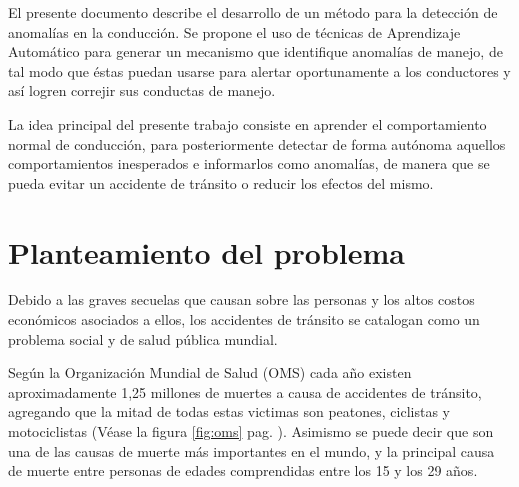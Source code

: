 
El presente documento describe el desarrollo de un m\'{e}todo para la detecci\'{o}n de anomal\'{i}as en la conducci\'{o}n. Se propone el uso de t\'{e}cnicas de Aprendizaje Autom\'{a}tico para generar un mecanismo que identifique anomal\'{i}as de manejo, de tal modo que \'{e}stas puedan usarse para alertar oportunamente a los conductores y as\'{i} logren correjir sus conductas de manejo.

\vspace{5mm} %

La idea principal del presente trabajo consiste en aprender el comportamiento normal de conducci\'{o}n, para posteriormente detectar de forma aut\'{o}noma aquellos comportamientos inesperados e informarlos como anomal\'{i}as, de manera que se pueda evitar  un accidente de tr\'{a}nsito o reducir los efectos del mismo.


\section{Planteamiento del problema}

Debido a las graves secuelas que causan sobre las personas y los altos costos econ\'{o}micos asociados a ellos, los accidentes de tr\'{a}nsito se catalogan como un problema social y de salud p\'{u}blica mundial.

\vspace{5mm} %

Seg\'{u}n la Organizaci\'{o}n Mundial de Salud (OMS) cada a\~{n}o existen aproximadamente 1,25 millones de muertes a causa de accidentes de tr\'{a}nsito, agregando que la mitad de todas estas victimas son peatones, ciclistas y motociclistas (V\'{e}ase la figura \ref{fig:oms} pag. \pageref{fig:oms}). Asimismo se puede decir que son una de las causas de muerte más importantes en el mundo, y la principal causa de muerte entre personas de edades comprendidas entre los 15 y los 29 años. 

\vspace{5mm} %

